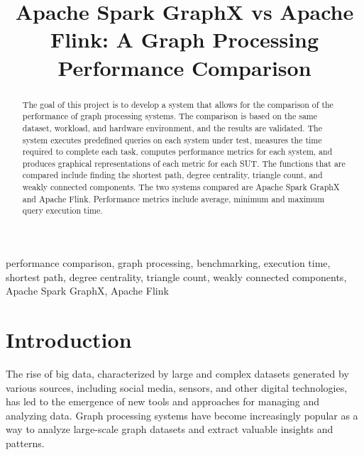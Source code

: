 \documentclass[conference]{IEEEtran}
\begin{document}
\title{Apache Spark GraphX vs Apache Flink: A Graph Processing Performance Comparison\\
}

\author{
\and
{}
}

\maketitle

\begin{abstract}
The goal of this project is to develop a system that allows for the comparison of the performance of graph processing systems. The comparison is based on the same dataset, workload, and hardware environment, and the results are validated. The system executes predefined queries on each system under test, measures the time required to complete each task, computes performance metrics for each system, and produces graphical representations of each metric for each SUT. The functions that are compared include finding the shortest path, degree centrality, triangle count, and weakly connected components. The two systems compared are Apache Spark GraphX and Apache Flink. Performance metrics include average, minimum and maximum query execution time.
\end{abstract}

\begin{IEEEkeywords}
performance comparison, graph processing, benchmarking, execution time, shortest path, degree centrality, triangle count, weakly connected components, Apache Spark GraphX, Apache Flink
\end{IEEEkeywords}

\section{\textbf{Introduction}}\label{intro}
The rise of big data, characterized by large and complex datasets generated by various sources, including social media, sensors, and other digital technologies, has led to the emergence of new tools and approaches for managing and analyzing data. Graph processing systems have become increasingly popular as a way to analyze large-scale graph datasets and extract valuable insights and patterns.
\end{document}
